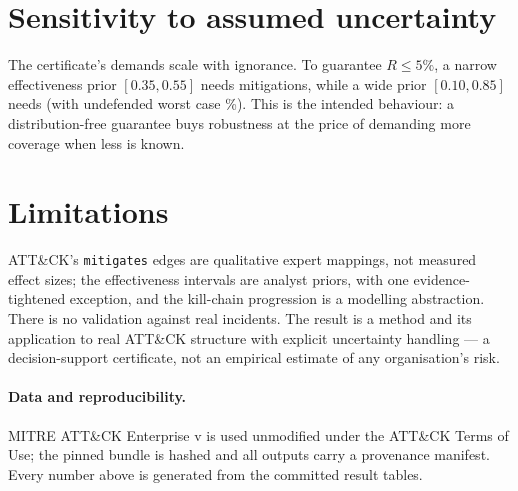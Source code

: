 \documentclass[11pt]{article}
\begin{document}
\section{Sensitivity to assumed uncertainty}
The certificate's demands scale with ignorance. To guarantee $R\le 5\%$, a narrow
effectiveness prior $[0.35,0.55]$ needs \CertMinGuardNarrow{} mitigations, while a
wide prior $[0.10,0.85]$ needs \CertMinGuardWide{} (with undefended worst case
\CertWideEmptyPct\%). This is the intended behaviour: a distribution-free guarantee
buys robustness at the price of demanding more coverage when less is known.

\section{Limitations}
ATT\&CK's \texttt{mitigates} edges are qualitative expert mappings, not measured
effect sizes; the effectiveness intervals are analyst priors, with one
evidence-tightened exception, and the kill-chain progression is a modelling
abstraction. There is no validation against real incidents. The result is a
method and its application to real ATT\&CK structure with explicit uncertainty
handling --- a decision-support certificate, not an empirical estimate of any
organisation's risk.

\paragraph{Data and reproducibility.} MITRE ATT\&CK Enterprise v\CertAttackVersion{}
is used unmodified under the ATT\&CK Terms of Use; the pinned bundle is hashed and
all outputs carry a provenance manifest. Every number above is generated from the
committed result tables.
\end{document}
